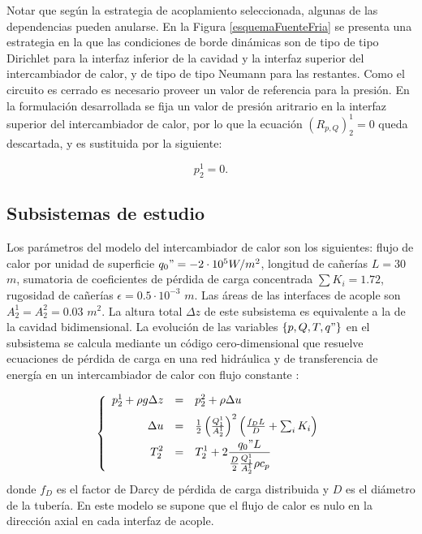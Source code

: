 Notar que según la estrategia de acoplamiento seleccionada, algunas de las dependencias pueden anularse.
En la Figura \ref{esquemaFuenteFria} se presenta una estrategia en la que las condiciones de borde dinámicas son 
de tipo de tipo Dirichlet para la interfaz inferior de la cavidad y la interfaz superior del intercambiador de calor, 
y de tipo de tipo Neumann para las restantes.
Como el circuito es cerrado es necesario proveer un valor de referencia para la presión.
En la formulación desarrollada se fija un valor de presión aritrario en la interfaz superior del intercambiador de calor,
por lo que la ecuación $(R_{p,Q})_{2}^{1}=0$ queda descartada, y es sustituida por la siguiente:

\begin{equation*}
p_2^1 = 0.
\end{equation*}

\subsection*{Subsistemas de estudio}
Los parámetros del modelo del intercambiador de calor son los siguientes:
flujo de calor por unidad de superficie $q_0"=-2\cdot 10^5 W/m^2$, 
longitud de cañerías $L=30$ $m$, 
sumatoria de coeficientes de pérdida de carga concentrada $\sum K_i=1.72$, 
rugosidad de cañerías $\epsilon=0.5\cdot 10^{-3}$ $m$.
Las áreas de las interfaces de acople son $A_2^1=A_2^2=0.03$ $m^2$.
La altura total $\Delta z$ de este subsistema es equivalente a la de la cavidad bidimensional.
La evolución de las variables $\{p,Q,T,q"\}$ en el subsistema se calcula mediante un código cero-dimensional
que resuelve ecuaciones de pérdida de carga en una red hidráulica \cite{iedelchik}
y de transferencia de energía en un intercambiador de calor con flujo constante \cite{kays}:

\begin{equation}
\left\{ \begin{array}{rcl}
p_2^1 + \rho g \Delta z &=& p_2^2 + \rho \Delta u \\ [0.2cm]
\displaystyle \Delta u &=& \frac{1}{2} \left( \frac{Q_1^1}{A_2^1} \right)^2  \left( \frac {f_D L} {D} + \sum_i K_i \right) \\ [0.2cm]
\displaystyle T_2^2 &=& \displaystyle T_2^1 + 2 \frac {q_0" L}{\frac{D}{2} \frac{Q_1^1}{A_2^1}\rho c_p}
\label{eq-intercambiador}
\end{array}
\right.
\end{equation}
donde $f_D$ es el factor de Darcy de pérdida de carga distribuida y $D$ es el diámetro de la tubería.
En este modelo se supone que el flujo de calor es nulo en la dirección axial en cada interfaz de acople.

